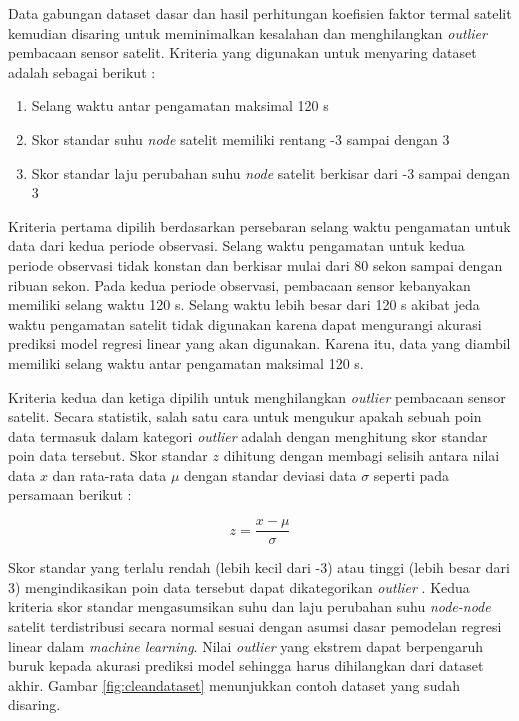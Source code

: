 Data gabungan dataset dasar dan hasil perhitungan koefisien faktor termal
satelit kemudian disaring untuk meminimalkan kesalahan dan menghilangkan
\textit{outlier} pembacaan sensor satelit. Kriteria yang digunakan untuk
menyaring dataset adalah sebagai berikut :

\begin{enumerate}
\item Selang waktu antar pengamatan maksimal 120 s 
\item Skor standar suhu \textit{node} satelit memiliki rentang -3 sampai dengan 3
\item Skor standar laju perubahan suhu \textit{node} satelit berkisar dari -3 sampai dengan 3 
\end{enumerate}

Kriteria pertama dipilih berdasarkan persebaran selang waktu pengamatan untuk
data dari kedua periode observasi. Selang waktu pengamatan untuk kedua periode
observasi tidak konstan dan berkisar mulai dari 80 sekon sampai dengan ribuan
sekon. Pada kedua periode observasi, pembacaan sensor kebanyakan memiliki
selang waktu 120 s. Selang waktu lebih besar dari 120 s akibat jeda waktu
pengamatan satelit tidak digunakan karena dapat mengurangi akurasi prediksi
model regresi linear yang akan digunakan. Karena itu, data yang diambil
memiliki selang waktu antar pengamatan maksimal 120 s.

Kriteria kedua dan ketiga dipilih untuk menghilangkan \textit{outlier}
pembacaan sensor satelit. Secara statistik, salah satu cara untuk mengukur
apakah sebuah poin data termasuk dalam kategori \textit{outlier} adalah dengan
menghitung skor standar poin data tersebut. Skor standar $z$ dihitung dengan
membagi selisih antara nilai data $x$ dan rata-rata data $\mu$ dengan standar deviasi
data $\sigma$ seperti pada persamaan berikut \cite{massaron}:

\begin{equation}
\label{eq:zscore}
	z = \frac{x - \mu}{\sigma}
\end{equation}

Skor standar yang terlalu rendah (lebih kecil dari -3) atau tinggi (lebih besar
dari 3) mengindikasikan poin data tersebut dapat dikategorikan \textit{outlier}
\cite{boschetti2015}. Kedua kriteria skor standar mengasumsikan suhu dan laju
perubahan suhu \textit{node-node} satelit terdistribusi secara normal sesuai
dengan asumsi dasar pemodelan regresi linear dalam \textit{machine learning}.
Nilai \textit{outlier} yang ekstrem dapat berpengaruh buruk kepada akurasi
prediksi model sehingga harus dihilangkan dari dataset akhir. Gambar
\ref{fig:cleandataset} menunjukkan contoh dataset yang sudah disaring.

